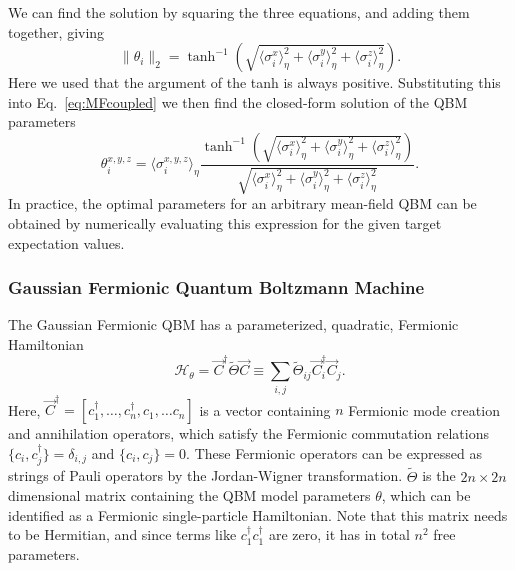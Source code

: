 \documentclass[
    aps,
    prx,
    onecolumn
]{revtex4-2}
\begin{document}
We can find the solution by squaring the three equations, and adding them together, giving
\begin{equation}
    \| \theta_i \|_2 = \tanh^{-1} \left(  \sqrt{\langle \sigma_i^{x}\rangle_\eta^2 + \langle \sigma_i^{y}\rangle_\eta^2 + \langle \sigma_i^{z}\rangle_\eta^2  } \right).
\end{equation}
Here we used that the argument of the tanh is always positive. Substituting this into Eq.~\eqref{eq:MFcoupled} we then find the closed-form solution of the QBM parameters
\begin{equation}
\theta_i^{x,y,z} = \langle \sigma_i^{x,y,z}\rangle_\eta \frac{ \tanh^{-1} \left( \sqrt{\langle \sigma_i^{x}\rangle_\eta^2 + \langle \sigma_i^{y}\rangle_\eta^2 + \langle \sigma_i^{z}\rangle_\eta^2  } \right) }{ \sqrt{\langle \sigma_i^{x}\rangle_\eta^2 + \langle \sigma_i^{y}\rangle_\eta^2 + \langle \sigma_i^{z}\rangle_\eta^2  } }.
\end{equation} 
In practice, the optimal parameters for an arbitrary mean-field QBM can be obtained by numerically evaluating this expression for the given target expectation values. 

\subsubsection{Gaussian Fermionic Quantum Boltzmann Machine}

The Gaussian Fermionic QBM has a parameterized, quadratic, Fermionic Hamiltonian
\begin{equation}
    \mathcal{H}_\theta = \vec{C}^\dagger \tilde{\Theta} \vec{C} \equiv \sum_{i,j}\tilde{\Theta}_{ij} \vec{C}^\dagger_i \vec{C}_j.
\end{equation}
Here, $\vec{C}^\dagger = [c_1^\dagger, \dots, c_n^\dagger, c_1, \dots c_n ]$ is a vector containing $n$ Fermionic mode creation and annihilation operators, which satisfy the Fermionic commutation relations $\{c_i, c_j^\dagger\}=\delta_{i,j}$ and $\{c_i, c_j\}=0$. These Fermionic operators can be expressed as strings of Pauli operators by the Jordan-Wigner transformation. $\tilde{\Theta}$ is the  $2n\times 2n$ dimensional matrix containing the QBM model parameters $\theta$, which can be identified as a Fermionic single-particle Hamiltonian. Note that this matrix needs to be Hermitian, and since terms like $c^\dagger_1 c^\dagger_1$ are zero, it has in total $n^2$ free parameters. 
\end{document}
